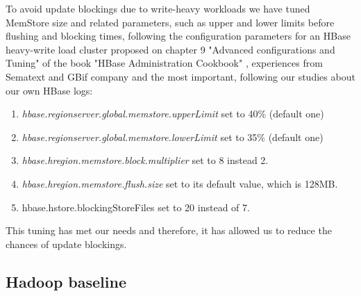\begin{enumerate}
To avoid update blockings due to write-heavy workloads we have tuned MemStore size and related parameters, such as upper and lower limits before flushing and blocking times, following the configuration parameters for an HBase heavy-write load cluster proposed on chapter 9 "Advanced configurations and Tuning" of the book "HBase Administration Cookbook" \cite{jiang2012hbase}, experiences from Sematext \cite{MemstoreSematext} and GBif company \cite{MemstoreGBif} and the most important, following our studies about our own HBase logs:
\bigskip
\begin{enumerate}
\item \textit{hbase.regionserver.global.memstore.upperLimit} set to 40\% (default one)
\item \textit{hbase.regionserver.global.memstore.lowerLimit} set to 35\% (default one)
\item \textit{hbase.hregion.memstore.block.multiplier} set to 8 instead 2.
\item \textit{hbase.hregion.memstore.flush.size} set to its default value, which is 128MB.
\item {hbase.hstore.blockingStoreFiles} set to 20 instead of 7.
\end{enumerate}

This tuning has met our needs and therefore, it has allowed us to reduce the chances of update blockings.
\par


\end{enumerate}


\subsection{Hadoop baseline}

